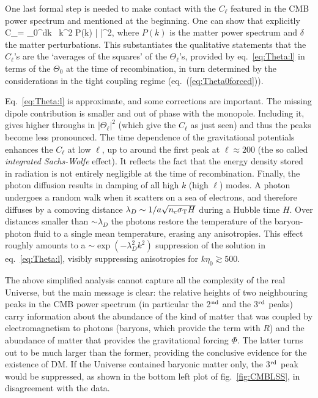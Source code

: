 \smallskip

One last formal step is needed to make contact with the $C_\ell$ featured in the CMB power spectrum and mentioned at the beginning. One can show that explicitly 
\beq
C_\ell =  \int_0^\infty dk \, k^2 P(k) \left|  \right|^2,
\eeq
where $P(k)$ is the matter power spectrum and $\delta$ the matter perturbations. This substantiates the qualitative statements that the $C_\ell$'s are the `averages of the squares' of the $\Theta_\ell$'s, provided by eq.~\eqref{eq:Theta:l} in terms of the $\Theta_0$ at the time of recombination, in turn determined by the considerations in the tight coupling regime (eq.~(\ref{eq:Theta0forced})).

\medskip

Eq.~\eqref{eq:Theta:l} is approximate, and some corrections are important.
The missing dipole contribution is smaller and out of phase with the monopole. 
Including it, gives higher throughs in $|\Theta_\ell|^2$ (which give the $C_\ell$ as just seen) 
and thus the peaks become less pronounced. 
The time dependence of the gravitational potentials 
enhances the $C_\ell$ at low $\ell$, up to around the first peak at $\ell \approx 200$ (the so called {\em integrated Sachs-Wolfe} effect). 
It reflects the fact that the energy density stored in radiation is not entirely negligible at the time of recombination. Finally, the photon diffusion results in damping of all high $k$ (high $\ell$) modes. A photon undergoes a random walk when it scatters on a sea of electrons, and therefore diffuses by 
a comoving distance $\lambda_D\sim 1/a\sqrt{n_e\sigma_{\rm T} H}$ during a Hubble time $H$. 
Over distances smaller than $\sim \lambda_D$
the photons restore the temperature of the baryon-photon fluid to a single mean temperature, erasing any anisotropies. This effect roughly amounts to a $\sim \exp (-\lambda_D^2 k^2)$ suppression of the solution in eq.~\eqref{eq:Theta:l}, visibly suppressing anisotropies for $k\eta_0\gtrsim 500$. 


\bigskip

The above simplified analysis cannot capture all the complexity of the real Universe, but the main message is clear:  the relative heights of two neighbouring peaks in the CMB power spectrum (in particular the 2$^{\rm nd}$ and the 3$^{\rm rd}$ peaks) 
carry information about the abundance of the kind of matter that was coupled by electromagnetism to photons 
(baryons, which provide the term with $R$) and the abundance of matter that provides the gravitational forcing $\Phi$. 
The latter turns out to be much larger than the former, providing the conclusive evidence for the existence of DM.
If the Universe contained baryonic matter only, the 3$^{\rm rd}$ peak would be suppressed, as shown in the bottom left plot of fig.~\ref{fig:CMBLSS}, in disagreement with the data.



